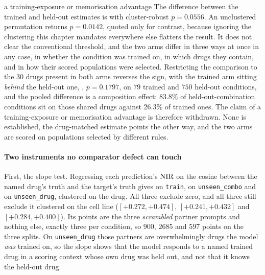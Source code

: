%
\begin{withdrawn}{a training-exposure or memorisation advantage}
The difference between the trained and held-out estimates is
 with cluster-robust $p = 0.0556$. An unclustered
permutation returns $p = 0.0142$, quoted only for contrast, because ignoring the
clustering this chapter mandates everywhere else flatters the result. It does
not clear the conventional threshold, and the two arms differ in three ways at
once in any case, in whether the condition was trained on, in which drugs they
contain, and in how their scored populations were selected. Restricting the
comparison to the $30$ drugs present in both arms reverses the sign, with the
trained arm sitting \emph{behind} the held-out one,
, $p = 0.1797$, on $79$ trained and $750$
held-out conditions, and the pooled difference is a composition effect: $83.8\%$
of held-out-combination conditions sit on those shared drugs against $26.3\%$
of trained ones. The claim of a training-exposure or memorisation advantage is
therefore withdrawn. None is established, the drug-matched estimate points the
other way, and the two arms are scored on populations selected by different
rules.
\end{withdrawn}

\paragraph{Two instruments no comparator defect can touch} First, the slope test.
Regressing each prediction's $\textrm{NIR}$ on the cosine between the named drug's truth
and the target's truth gives  on \texttt{train},
 on \texttt{unseen\_combo} and
 on \texttt{unseen\_drug}, clustered on the drug. All
three exclude zero, and all three still exclude it clustered on the cell line
($[+0.272, +0.474]$, $[+0.241, +0.432]$ and $[+0.284, +0.400]$). Its points are
the three \emph{scrambled} partner prompts and nothing else, exactly three per
condition, so $900$, $\num{2685}$ and $597$ points on the three splits. On
\texttt{unseen\_drug} those partners are overwhelmingly drugs the model
\emph{was} trained on, so the slope shows that the model responds to a named
trained drug in a scoring context whose own drug was held out, and not that it
knows the held-out drug.

